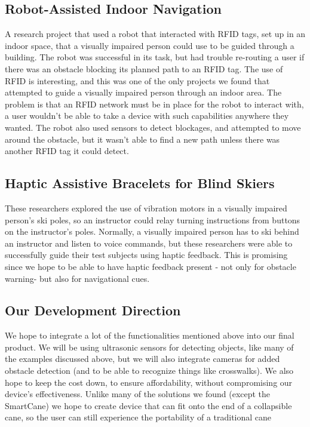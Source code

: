 \documentclass[letterpaper,12pt]{article}
\begin{document}
\subsection{Robot-Assisted Indoor Navigation} 

A research project that used a robot that interacted with RFID tags, set up in an indoor space, that a visually impaired person could use to be guided through a building. The robot was successful in its task, but had trouble re-routing a user if there was an obstacle blocking its planned path to an RFID tag. The use of RFID is interesting, and this was one of the only projects we found that attempted to guide a visually impaired person through an indoor area. The problem is that an RFID network must be in place for the robot to interact with, a user wouldn’t be able to take a device with such capabilities anywhere they wanted. The robot also used sensors to detect blockages, and attempted to move around the obstacle, but it wasn’t able to find a new path unless there was another RFID tag it could detect. \cite{Indoor}

\subsection{Haptic Assistive Bracelets for Blind Skiers}

These researchers explored the use of vibration motors in a visually impaired person’s ski poles, so an instructor could relay turning instructions from buttons on the instructor’s poles. Normally, a visually impaired person has to ski behind an instructor and listen to voice commands, but these researchers were able to successfully guide their test subjects using haptic feedback. This is promising since we hope to be able to have haptic feedback present - not only for obstacle warning- but also for navigational cues. \cite{Haptic}

\subsection {Our Development Direction }

We hope to integrate a lot of the functionalities mentioned above into our final product. We will be using ultrasonic sensors for detecting objects, like many of the examples discussed above, but we will also integrate cameras for added obstacle detection (and to be able to recognize things like crosswalks). We also hope to keep the cost down, to ensure affordability, without compromising our device’s effectiveness. Unlike many of the solutions we found (except the SmartCane) we hope to create device that can fit onto the end of a collapsible cane, so the user can still experience the portability of a traditional cane
\end{document}
